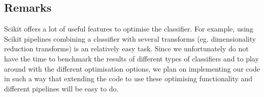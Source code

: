 \subsection{Remarks}
Scikit offers a lot of useful features to optimise the classifier. For example, using Scikit pipelines combining a classifier with several transforms (eg. dimensionality reduction transforms) is an relatively easy task. Since we unfortunately do not have the time to benchmark the results of different types of classifiers and to play around with the different optimisation options, we plan on implementing our code in such a way that extending the code to use these optimising functionality and different pipelines will be easy to do.
